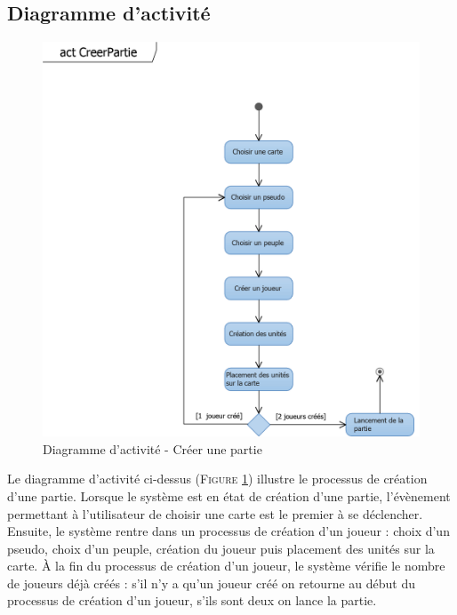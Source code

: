 \documentclass[a4paper,11pt]{article}
\begin{document}
\subsection{Diagramme d'activité}
\vspace*{0.5cm}
\begin{figure}[ht!]
\includegraphics{actCreerPartie.png}
\caption{Diagramme d'activité - Créer une partie}
\label{fig:actcreer}
\end{figure}
\vspace*{1cm}
Le diagramme d'activité ci-dessus (\textsc{Figure \ref{fig:actcreer}}) illustre le processus de création d'une partie. Lorsque le système est en état de création d'une partie, l'évènement permettant à l'utilisateur de choisir une carte est le premier à se déclencher. Ensuite, le système rentre dans un processus de création d'un joueur : choix d'un pseudo, choix d'un peuple, création du joueur puis placement des unités sur la carte. À la fin du processus de création d'un joueur, le système vérifie le nombre de joueurs déjà créés : s'il n'y a qu'un joueur créé on retourne au début du processus de création d'un joueur, s'ils sont deux on lance la partie.
\newpage
\end{document}
